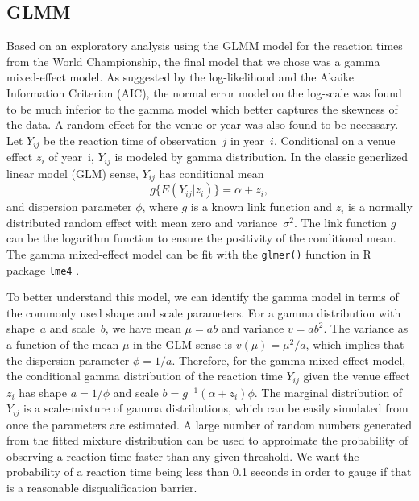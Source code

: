 \documentclass[12pt, letterpaper, titlepage]{article}
\begin{document}
\subsection{GLMM}
Based on an exploratory analysis using the GLMM model for the reaction times
from the World Championship, the final model that we chose was a gamma
mixed-effect model. As suggested by the log-likelihood and the Akaike Information
Criterion (AIC), the normal error model on the log-scale was found to be
much inferior to the gamma model which better captures the skewness of the
data. A random effect for the venue or year was also found to be necessary.
Let $Y_{ij}$ be the reaction time of observation~$j$ in year~$i$.
Conditional on a venue effect $z_i$ of year~i,  $Y_{ij}$ is modeled by 
gamma distribution. In the classic generlized linear model (GLM) sense,
$Y_{ij}$ has conditional mean
\[
g\{E(Y_{ij} | z_i)\} = \alpha + z_i,
\]
and dispersion parameter $\phi$, where $g$ is a known link function and
$z_i$ is a normally distributed random effect with mean zero and
variance~$\sigma^2$. The link function $g$ can be the logarithm function to
ensure the positivity of the conditional mean.
The gamma mixed-effect model can be fit with the \texttt{glmer()} function in R
package \texttt{lme4} \citep{lme4}.


To better understand this model, we can identify the gamma model in terms of the
commonly used shape and scale parameters. For a gamma distribution with
shape~$a$ and scale~$b$, we have mean $\mu = ab$ and variance $v = ab^2$. The
variance as a function of the mean $\mu$ in the GLM sense is
$v(\mu) = \mu^2 / a$, which implies that the dispersion parameter
$\phi = 1 / a$. Therefore, for the gamma mixed-effect model, the conditional
gamma distribution of the reaction time $Y_{ij}$ given the venue effect $z_i$
has shape $a = 1 / \phi$ and scale $b = g^{-1}(\alpha + z_i) \phi$. The marginal
distribution of $Y_{ij}$ is a scale-mixture of gamma distributions, which can be
easily simulated from once the parameters are estimated. A large number of
random numbers generated from the fitted mixture distribution can be used to
approimate the probability of observing a reaction time faster than any given
threshold.  We want the probability of a reaction time being less than 0.1
seconds in order to gauge if that is a reasonable disqualification barrier.
\end{document}
